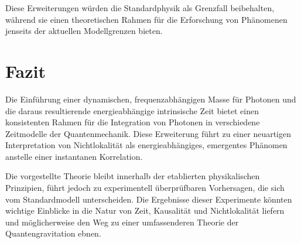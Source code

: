 \documentclass[a4paper,12pt]{article}
\begin{document}
	Diese Erweiterungen würden die Standardphysik als Grenzfall beibehalten, während sie einen theoretischen Rahmen für die Erforschung von Phänomenen jenseits der aktuellen Modellgrenzen bieten.
	
	\section{Fazit}
	Die Einführung einer dynamischen, frequenzabhängigen Masse für Photonen und die daraus resultierende energieabhängige intrinsische Zeit bietet einen konsistenten Rahmen für die Integration von Photonen in verschiedene Zeitmodelle der Quantenmechanik. Diese Erweiterung führt zu einer neuartigen Interpretation von Nichtlokalität als energieabhängiges, emergentes Phänomen anstelle einer instantanen Korrelation.
	
	Die vorgestellte Theorie bleibt innerhalb der etablierten physikalischen Prinzipien, führt jedoch zu experimentell überprüfbaren Vorhersagen, die sich vom Standardmodell unterscheiden. Die Ergebnisse dieser Experimente könnten wichtige Einblicke in die Natur von Zeit, Kausalität und Nichtlokalität liefern und möglicherweise den Weg zu einer umfassenderen Theorie der Quantengravitation ebnen.
	
\end{document}
